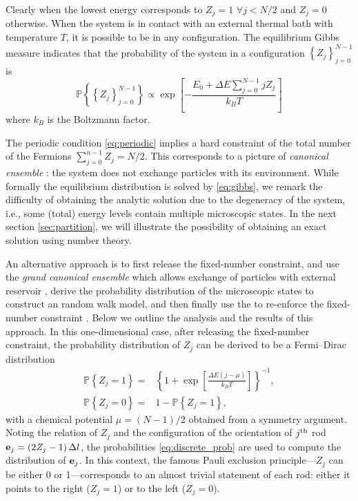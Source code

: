 \documentclass[twocolumn,showpacs,preprintnumbers,amsmath,amssymb,pre]{revtex4-1}
\newcommand{\pr}[1]{\mathbb{P}\left\{#1\right\}}
\renewcommand{\l}{\left}
\renewcommand{\r}{\right}
\newcommand{\subeq}[2]{\begin{subequations}\label{#2}\begin{align}#1\end{align}\end{subequations}}
\newcommand{\eq}[2]{\begin{equation}#1\label{#2}\end{equation}}
\begin{document}
Clearly when the lowest energy corresponds to $Z_j =1$ $\forall j < N/2$ and $Z_j=0$ otherwise. When the system is in contact with an external thermal bath with temperature $T$, it is possible to be in any configuration. The equilibrium Gibbs measure indicates that the probability of the system in a configuration $\l\{Z_j\r\}_{j=0}^{N-1}$ is
\eq{
\pr{\l\{Z_j\r\}_{j=0}^{N-1}} \propto \exp \l[-\frac{E_0 + \Delta E \sum_{j=0}^{N-1} j Z_j}{k_B T}\r]
}{eq:gibbs}
where $k_B$ is the Boltzmann factor. 

The periodic condition \eqref{eq:periodic} implies a hard constraint of the total number of the Fermions $\sum_{j=0}^{n-1} Z_j = N/2$. This corresponds to a picture of \emph{canonical ensemble} \cite{huang1987statistical}: the system does not exchange particles with its environment. While formally the equilibrium distribution is solved by \eqref{eq:gibbs}, we remark the difficulty of obtaining the analytic solution due to the degeneracy of the system, i.e., some (total) energy levels contain multiple microscopic states. In the next section \ref{sec:partition}, we will illustrate the possibility of obtaining an exact solution using number theory. 

An alternative approach is to first release the fixed-number constraint, and use the \emph{grand canonical ensemble} which allows exchange of particles with external reservoir \cite{huang1987statistical}, derive the probability distribution of the microscopic states to construct an random walk model, and then finally use the to re-enforce the fixed-number constraint \cite{lin2015pulled}. Below we outline the analysis and the results of this approach. In this one-dimensional case,   after releasing the fixed-number constraint, the probability distribution of $Z_j$ can be derived \cite{huang1987statistical} to be a Fermi--Dirac distribution
\subeq{
\pr{Z_j = 1} ={}& \l\{1+\exp\l[\frac{ \Delta E \l(j - \mu \r) }{k_B T}\r]\r\}^{-1}, \\
\pr{Z_j = 0} ={}& 1- \pr{Z_j = 1},
}{eq:discrete_prob}
with a chemical potential $\mu = (N-1)/2$ obtained from a symmetry argument. Noting the relation of $Z_j$ and the configuration of the orientation of $j^{\rm th}$ rod $\ve_j = \l(2Z_j -1\r) \Delta l$, the probabilities \eqref{eq:discrete_prob} are used to compute the distribution of ${\bf e}_j$. In this context, the famous Pauli exclusion principle---$Z_j$ can be either 0 or 1---corresponds to an almost trivial statement of each rod: either it points to the right ($Z_j=1$) or to the left ($Z_j=0$). 
\end{document}
